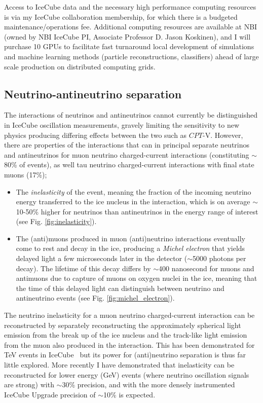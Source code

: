 \documentclass[a4paper,11pt]{article}
\begin{document}
Access to IceCube data and the necessary high performance computing resources is via my IceCube collaboration membership, for which there is a budgeted maintenance/operations fee. Additional computing resources are available at NBI (owned by NBI IceCube PI, Associate Professor D. Jason Koskinen), and I will purchase 10 GPUs to facilitate fast turnaround local development of simulations and machine learning methods (particle reconstructions, classifiers) ahead of large scale production on distributed computing grids. \\

\subsection{Neutrino-antineutrino separation}

The interactions of neutrinos and antineutrinos cannot currently be distinguished in IceCube oscillation measurements, gravely limiting the sensitivity to new physics producing differing effects between the two such as $CPT$-V. However, there are properties of the interactions that can in principal separate neutrinos and antineutrinos for muon neutrino charged-current interactions (constituting $\sim$80\% of events), as well tau neutrino charged-current interactions with final state muons (17\%);

\begin{itemize}[leftmargin=*]
    \item The \textit{inelasticity} of the event, meaning the fraction of the incoming neutrino energy transferred to the ice nucleus in the interaction, which is on average $\sim$10-50\%  higher for neutrinos than antineutrinos in the energy range of interest (see Fig. \ref{fig:inelasticity}).
    \item The (anti)muons produced in muon (anti)neutrino interactions eventually come to rest and decay in the ice, producing a \textit{Michel electron} that yields delayed light a few microseconds later in the detector ($\sim$5000 photons per decay). The lifetime of this decay differs by $\sim$400 nanosecond for muons and antimuons due to capture of muons on oxygen nuclei in the ice, meaning that the time of this delayed light can distinguish between neutrino and antineutrino events (see Fig. \ref{fig:michel_electron}). 
\end{itemize}

The neutrino inelasticity for a muon neutrino charged-current interaction can be reconstructed by separately reconstructing the approximately spherical light emission from the break up of the ice nucleus and the track-like light emission from the muon also produced in the interaction. This has been demonstrated for TeV events in IceCube~\cite{Aartsen:2018vez} but its power for (anti)neutrino separation is thus far little explored. More recently I have demonstrated that inelasticity can be reconstructed for lower energy (GeV) events (where neutrino oscillation signals are strong) with $\sim$30\% precision, and with the more densely instrumented IceCube Upgrade precision of $\sim$10\% is expected. 
\end{document}
